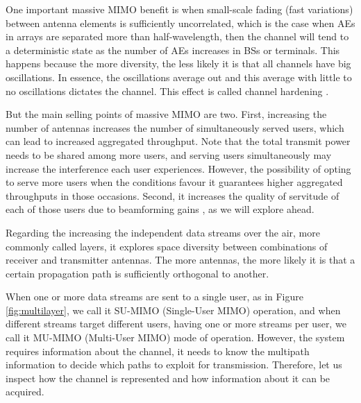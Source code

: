 
One important massive MIMO benefit is when small-scale fading (fast variations) between antenna elements is sufficiently uncorrelated, which is the case when AEs in arrays are separated more than half-wavelength, then the channel will tend to a deterministic state as the number of AEs increases in BSs or terminals. This happens because the more diversity, the less likely it is that all channels have big oscillations. In essence, the oscillations average out and this average with little to no oscillations dictates the channel. This effect is called channel hardening \cite{1327795}.

But the main selling points of massive MIMO are two. First, increasing the number of antennas increases the number of simultaneously served users, which can lead to increased aggregated throughput. Note that the total transmit power needs to be shared among more users, and serving users simultaneously may increase the interference each user experiences. However, the possibility of opting to serve more users when the conditions favour it guarantees higher aggregated throughputs in those occasions. Second, it increases the quality of servitude of each of those users due to beamforming gains \cite{7500452}, as we will explore ahead. 

Regarding the increasing the independent data streams over the air, more commonly called layers, it explores space diversity between combinations of receiver and transmitter antennas. The more antennas, the more likely it is that a certain propagation path is sufficiently orthogonal to another.

When one or more data streams are sent to a single user, as in Figure \ref{fig:multilayer}, we call it SU-MIMO (Single-User MIMO) operation, and when different streams target different users, having one or more streams per user, we call it MU-MIMO (Multi-User MIMO) mode of operation. However, the system requires information about the channel, it needs to know the multipath information to decide which paths to exploit for transmission. Therefore, let us inspect how the channel is represented and how information about it can be acquired.



